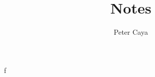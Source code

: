 \documentclass[10pt,a4paper,draft]{book}
\author{Peter Caya}
\title{Notes}
\begin{document}
f
\end{document}
